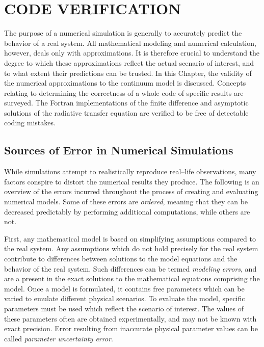 \chapter{CODE VERIFICATION}
\label{chap:model_analysis}
The purpose of a numerical simulation is generally to accurately predict the behavior of a real system.
All mathematical modeling and numerical calculation, however, deals only with approximations.
It is therefore crucial to understand the degree to which these approximations reflect the actual scenario of interest, and to what extent their predictions can be trusted.
In this Chapter, the validity of the numerical approximations to the continuum model is discussed.
Concepts relating to determining the correctness of a whole code of specific results are surveyed.
The Fortran implementations of the finite difference and asymptotic solutions of the radiative transfer equation are verified to be free of detectable coding mistakes.

\section{Sources of Error in Numerical Simulations}
While simulations attempt to realistically reproduce real--life observations, many factors conspire to distort the numerical results they produce.
The following is an overview of the errors incurred throughout the process of creating and evaluating numerical models.
Some of these errors are \textit{ordered}, meaning that they can be decreased predictably by performing additional computations, while others are not.

First, any mathematical model is based on simplifying assumptions compared to the real system.
Any assumptions which do not hold precisely for the real system contribute to differences between solutions to the model equations and the behavior of the real system.
Such differences can be termed \textit{modeling errors}, and are a present in the exact solutions to the mathematical equations comprising the model.
Once a model is formulated, it contains free parameters which can be varied to emulate different physical scenarios.
To evaluate the model, specific parameters must be used which reflect the scenario of interest.
The values of these parameters often are obtained experimentally, and may not be known with exact precision.
Error resulting from inaccurate physical parameter values can be called \textit{parameter uncertainty error}.

